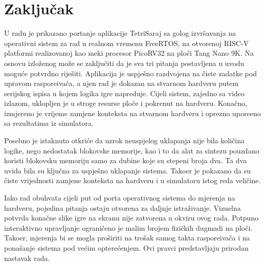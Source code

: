 \chapter*{Zaklju\v{c}ak}

U radu je prikazano portanje aplikacije TetriSaraj sa golog izvr\v{s}avanja na
operativni sistem za rad u realnom vremenu FreeRTOS, na otvorenoj RISC-V
platformi realizovanoj kao meki procesor PicoRV32 na plo\v{c}i Tang Nano 9K. Na
osnovu izlo\v{z}enog mo\v{z}e se zaklju\v{c}iti da je sva tri pitanja postavljena
u uvodu mogu\'ce potvrdno rije\v{s}iti. Aplikacija je uspje\v{s}no razdvojena na
\v{c}iste zadatke pod upravom raspore\dj{}iva\v{c}a, a njen rad je dokazan na
stvarnom hardveru putem serijskog ispisa u kojem logika igre napreduje. Cijeli
sistem, zajedno sa video izlazom, uklopljen je u stroge resurse plo\v{c}e i
pokrenut na hardveru. Kona\v{c}no, izmjereno je vrijeme zamjene konteksta na
stvarnom hardveru i oprezno upore\dj{}eno sa rezultatima iz simulatora.

Posebno je istaknuto otkri\'ce da uzrok neuspjelog uklapanja nije bila
koli\v{c}ina logike, nego nedostatak blokovske memorije, kao i to da alat za
sintezu pouzdano koristi blokovsku memoriju samo za dubine koje su stepeni broja
dva. Ta dva uvida bila su klju\v{c}na za uspje\v{s}no uklapanje sistema. Tako\dj{}er
je pokazano da su \v{c}iste vrijednosti zamjene konteksta na hardveru i u
simulatoru istog reda veli\v{c}ine.

Iako rad obuhvata cijeli put od porta operativnog sistema do mjerenja na
hardveru, pojedina pitanja ostaju otvorena za daljnje istra\v{z}ivanje.
Vizuelna potvrda kona\v{c}ne slike igre na ekranu nije zatvorena u okviru ovog
rada. Potpuno interaktivno upravljanje ograni\v{c}eno je malim brojem fizi\v{c}kih
dugmadi na plo\v{c}i. Tako\dj{}er, mjerenja bi se mogla pro\v{s}iriti na tro\v{s}ak
samog takta raspore\dj{}iva\v{c}a i na pona\v{s}anje sistema pod ve\'cim
optere\'cenjem. Ovi pravci predstavljaju prirodan nastavak rada.
